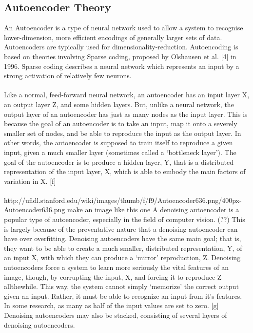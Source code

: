 \documentclass[12pt,twoside]{report}
\begin{document}
		\subsection{Autoencoder Theory}
An Autoencoder is a type of neural network used to allow a system to recognise lower-dimension, more efficient encodings of generally larger sets of data. Autoencoders are typically used for dimensionality-reduction. Autoencoding is based on theories involving Sparse coding, proposed by  Olshausen et al. [4] in 1996. Sparse coding describes a neural network which represents an input by a strong activation of relatively few neurons. 
\\ \\
Like a normal, feed-forward neural network, an autoencoder has an input layer X, an output layer Z, and some hidden layers. But, unlike a neural network, the output layer of an autoencoder has just as many nodes as the input layer. This is because the goal of an autoencoder is to take an input, map it onto a severely smaller set of nodes, and be able to reproduce the input as the output layer. In other words, the autoencoder is supposed to train itself to reproduce a given input, given a much smaller layer (sometimes called a ‘bottleneck layer’).
The goal of the autoencoder is to produce a hidden layer, Y, that is a distributed representation of the input layer, X, which is able to embody the main factors of variation in X. [f]
\\ \\
http://ufldl.stanford.edu/wiki/images/thumb/f/f9/Autoencoder636.png/400px-Autoencoder636.png make an image like this one 
A denoising autoencoder is a popular type of autoencoder, especially in the field of computer vision. (??) This is largely because of the preventative nature that a denoising autoencoder can have over overfitting. Denoising autoencoders have the same main goal; that is, they want to be able to create a much smaller, distributed representation, Y, of an input X, with which they can produce a ‘mirror’ reproduction, Z. Denoising autoencoders force a system to learn more seriously the vital features of an image, though, by corrupting the input, X, and forcing it to reproduce Z allthewhile. This way, the system cannot simply ‘memorize’ the correct output given an input. Rather, it must be able to recognize an input from it’s features. In some research, as many as half of the input values are set to zero. [g] Denoising autoencoders may also be stacked, consisting of several layers of denoising autoencoders. 
\end{document}
